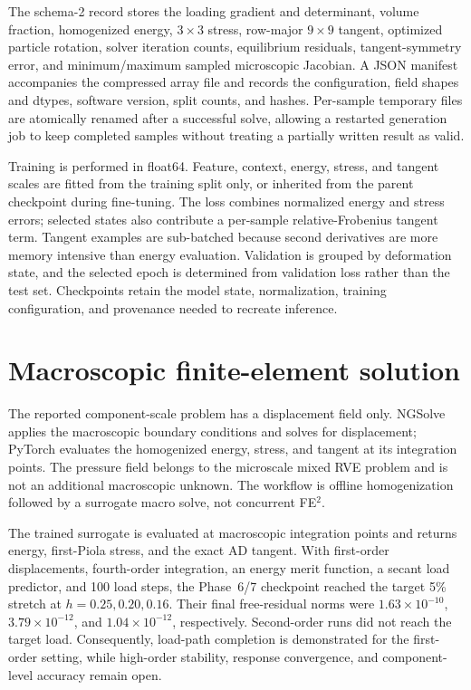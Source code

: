 The schema-2 record stores the loading gradient and determinant, volume
fraction, homogenized energy, \(3\times3\) stress, row-major \(9\times9\)
tangent, optimized particle rotation, solver iteration counts, equilibrium
residuals, tangent-symmetry error, and minimum/maximum sampled microscopic
Jacobian. A JSON manifest accompanies the compressed array file and records
the configuration, field shapes and dtypes, software version, split counts,
and hashes. Per-sample temporary files are atomically renamed after a
successful solve, allowing a restarted generation job to keep completed
samples without treating a partially written result as valid.

Training is performed in float64. Feature, context, energy, stress, and
tangent scales are fitted from the training split only, or inherited from
the parent checkpoint during fine-tuning. The loss combines normalized
energy and stress errors; selected states also contribute a per-sample
relative-Frobenius tangent term. Tangent examples are sub-batched because
second derivatives are more memory intensive than energy evaluation.
Validation is grouped by deformation state, and the selected epoch is
determined from validation loss rather than the test set. Checkpoints retain
the model state, normalization, training configuration, and provenance
needed to recreate inference.

\section{Macroscopic finite-element solution}

The reported component-scale problem has a displacement field only. NGSolve
applies the macroscopic boundary conditions and solves for displacement;
PyTorch evaluates the homogenized energy, stress, and tangent at its
integration points. The pressure field belongs to the microscale mixed RVE
problem and is not an additional macroscopic unknown. The workflow is offline
homogenization followed by a surrogate macro solve, not concurrent FE\(^2\).

The trained surrogate is evaluated at macroscopic integration points and
returns energy, first-Piola stress, and the exact AD tangent. With first-order
displacements, fourth-order integration, an energy merit function, a secant
load predictor, and 100 load steps, the Phase~6/7 checkpoint reached the
target 5\% stretch at \(h=0.25,0.20,0.16\). Their final free-residual norms were
\(1.63\times10^{-10}\), \(3.79\times10^{-12}\), and
\(1.04\times10^{-12}\), respectively. Second-order runs did not reach the
target load. Consequently, load-path completion is demonstrated for the
first-order setting, while high-order stability, response convergence, and
component-level accuracy remain open.

